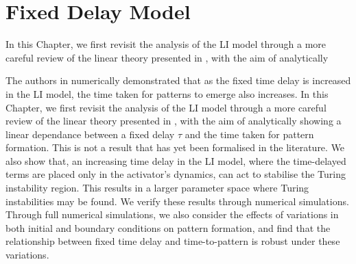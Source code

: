 \chapter{Fixed Delay Model}

In this Chapter, we first revisit the analysis of the LI model through a more careful review of the linear theory presented in \cite{yigaffneyli,jiang}, with the aim of analytically

The authors in \cite{gaffmonk} numerically demonstrated that as the fixed time delay is increased in the LI model, the time taken for patterns to emerge also increases. In this Chapter, we first revisit the analysis of the LI model through a more careful review of the linear theory presented in \cite{yigaffneyli,jiang}, with the aim of analytically showing a linear dependance between a fixed delay $\tau$ and the time taken for pattern formation. This is not a result that has yet been formalised in the literature. We also show that, an increasing time delay in the LI model, where the time-delayed terms are placed only in the activator's dynamics, can act to stabilise the Turing instability region. This results in a larger parameter space where Turing instabilities may be found. We verify these results through numerical simulations. Through full numerical simulations, we also consider the effects of variations in both initial and boundary conditions on pattern formation, and find that the relationship between fixed time delay and time-to-pattern is robust under these variations.


